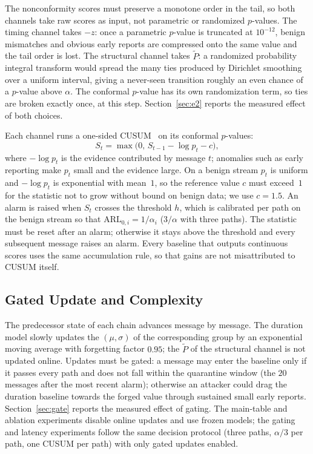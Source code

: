 \documentclass[manuscript,screen,review]{acmart}
\begin{document}
The nonconformity scores must preserve a monotone order in the tail, so both channels take raw scores as input, not parametric or randomized $p$-values. The timing channel takes $-z$: once a parametric $p$-value is truncated at $10^{-12}$, benign mismatches and obvious early reports are compressed onto the same value and the tail order is lost. The structural channel takes $\tilde P$: a randomized probability integral transform would spread the many ties produced by {Dirichlet} smoothing over a uniform interval, giving a never-seen transition roughly an even chance of a $p$-value above $\alpha$. The conformal $p$-value has its own randomization term, so ties are broken exactly once, at this step. Section~\ref{sec:e2} reports the measured effect of both choices.

Each channel runs a one-sided {CUSUM}~\cite{li2015quickest} on its conformal $p$-values:
\begin{equation}
  S_t=\max\bigl(0,\,S_{t-1}-\log p_t-c\bigr),
  \label{eq:cusum}
\end{equation}
where $-\log p_t$ is the evidence contributed by message $t$; anomalies such as early reporting make $p_t$ small and the evidence large. On a benign stream $p_t$ is uniform and $-\log p_t$ is exponential with mean~$1$, so the reference value $c$ must exceed~$1$ for the statistic not to grow without bound on benign data; we use $c=1.5$. An alarm is raised when $S_t$ crosses the threshold $h$, which is calibrated per path on the benign stream so that $\mathrm{ARL}_{0,i}=1/\alpha_i$ ($3/\alpha$ with three paths). The statistic must be reset after an alarm; otherwise it stays above the threshold and every subsequent message raises an alarm. Every baseline that outputs continuous scores uses the same accumulation rule, so that gains are not misattributed to {CUSUM} itself.

\subsection{Gated Update and Complexity}
\label{sec:online}

The predecessor state of each chain advances message by message. The duration model slowly updates the $(\mu,\sigma)$ of the corresponding group by an exponential moving average with forgetting factor $0.95$; the $\tilde P$ of the structural channel is not updated online. Updates must be gated: a message may enter the baseline only if it passes every path and does not fall within the quarantine window (the $20$ messages after the most recent alarm); otherwise an attacker could drag the duration baseline towards the forged value through sustained small early reports. Section~\ref{sec:gate} reports the measured effect of gating. The main-table and ablation experiments disable online updates and use frozen models; the gating and latency experiments follow the same decision protocol (three paths, $\alpha/3$ per path, one {CUSUM} per path) with only gated updates enabled.
\end{document}

